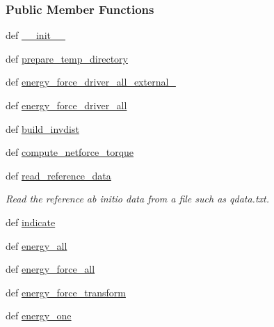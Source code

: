 \subsubsection*{Public Member Functions}
\begin{DoxyCompactItemize}
\item 
def \hyperlink{classforcebalance_1_1amberio_1_1AbInitio__AMBER_ab4a2fcc38e45455b90ada9daedcb180c}{\-\_\-\-\_\-init\-\_\-\-\_\-}
\item 
def \hyperlink{classforcebalance_1_1amberio_1_1AbInitio__AMBER_a1d224b2406545021d839c6189a0a4cdb}{prepare\-\_\-temp\-\_\-directory}
\item 
def \hyperlink{classforcebalance_1_1amberio_1_1AbInitio__AMBER_ad0fcc43d857471ee074361076c040ea5}{energy\-\_\-force\-\_\-driver\-\_\-all\-\_\-external\-\_\-}
\item 
def \hyperlink{classforcebalance_1_1amberio_1_1AbInitio__AMBER_a64ccf943e550392c654ec7bb6c6ff81b}{energy\-\_\-force\-\_\-driver\-\_\-all}
\item 
def \hyperlink{classforcebalance_1_1abinitio_1_1AbInitio_a7475857193eefd4edd020d4f2a8fec17}{build\-\_\-invdist}
\item 
def \hyperlink{classforcebalance_1_1abinitio_1_1AbInitio_afbf86c26158a68cae7460b4106809fdd}{compute\-\_\-netforce\-\_\-torque}
\item 
def \hyperlink{classforcebalance_1_1abinitio_1_1AbInitio_aa73bedbf1e2cf19f2fa1e88815f1bd86}{read\-\_\-reference\-\_\-data}
\begin{DoxyCompactList}\small\item\em Read the reference ab initio data from a file such as qdata.\-txt. \end{DoxyCompactList}\item 
def \hyperlink{classforcebalance_1_1abinitio_1_1AbInitio_a3260db78e8c174f04a64661c4e5c181c}{indicate}
\item 
def \hyperlink{classforcebalance_1_1abinitio_1_1AbInitio_a99cca2d0bcbb382fcf7069907e74639f}{energy\-\_\-all}
\item 
def \hyperlink{classforcebalance_1_1abinitio_1_1AbInitio_acffb00d0edc291791eafb8a2d63ab3a1}{energy\-\_\-force\-\_\-all}
\item 
def \hyperlink{classforcebalance_1_1abinitio_1_1AbInitio_afdcc0b598565afa1b1456f78f87cc1be}{energy\-\_\-force\-\_\-transform}
\item 
def \hyperlink{classforcebalance_1_1abinitio_1_1AbInitio_aa91a79773331fdf845ab34e54ce99d47}{energy\-\_\-one}
\item 

\end{DoxyCompactItemize}
